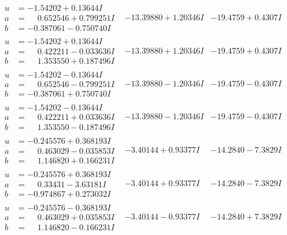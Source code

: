 \documentclass[1p]{elsarticle_modified}
\theoremstyle{definition}
\begin{document}
$$\begin{array}{c|c|c}
\begin{aligned}
u &= -1.54202 + 0.13644 I \\
a &= \phantom{-}0.652546 + 0.799251 I \\
b &= -0.387061 - 0.750740 I\end{aligned}
 & -13.39880 + 1.20346 I & -19.4759 + 0.4307 I \\ \hline\begin{aligned}
u &= -1.54202 + 0.13644 I \\
a &= \phantom{-}0.422211 - 0.033636 I \\
b &= \phantom{-}1.353550 + 0.187496 I\end{aligned}
 & -13.39880 + 1.20346 I & -19.4759 + 0.4307 I \\ \hline\begin{aligned}
u &= -1.54202 - 0.13644 I \\
a &= \phantom{-}0.652546 - 0.799251 I \\
b &= -0.387061 + 0.750740 I\end{aligned}
 & -13.39880 - 1.20346 I & -19.4759 - 0.4307 I \\ \hline\begin{aligned}
u &= -1.54202 - 0.13644 I \\
a &= \phantom{-}0.422211 + 0.033636 I \\
b &= \phantom{-}1.353550 - 0.187496 I\end{aligned}
 & -13.39880 - 1.20346 I & -19.4759 - 0.4307 I \\ \hline\begin{aligned}
u &= -0.245576 + 0.368193 I \\
a &= \phantom{-}0.463029 - 0.035853 I \\
b &= \phantom{-}1.146820 + 0.166231 I\end{aligned}
 & -3.40144 + 0.93377 I & -14.2840 - 7.3829 I \\ \hline\begin{aligned}
u &= -0.245576 + 0.368193 I \\
a &= \phantom{-}0.33431 - 3.63181 I \\
b &= -0.974867 + 0.273032 I\end{aligned}
 & -3.40144 + 0.93377 I & -14.2840 - 7.3829 I \\ \hline\begin{aligned}
u &= -0.245576 - 0.368193 I \\
a &= \phantom{-}0.463029 + 0.035853 I \\
b &= \phantom{-}1.146820 - 0.166231 I\end{aligned}
 & -3.40144 - 0.93377 I & -14.2840 + 7.3829 I \\ \hline\begin{aligned}

\end{aligned}
\end{array}$$
\end{document}

